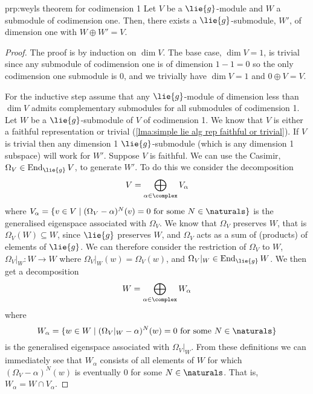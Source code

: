 \documentclass[fleqn]{NotesClass}
\DeclareMathOperator{\End}{End}
\begin{document}
    \begin{prp}{}{prp:weyls theorem for codimension 1}
        Let \(V\) be a \(\lie{g}\)-module and \(W\) a submodule of codimension one.
        Then, there exists a \(\lie{g}\)-submodule, \(W'\), of dimension one with \(W \oplus W' = V\).
        \begin{proof}
            The proof is by induction on \(\dim V\).
            The base case, \(\dim V = 1\), is trivial since any submodule of codimension one is of dimension \(1 - 1 = 0\) so the only codimension one submodule is \(0\), and we trivially have \(\dim V = 1\) and \(0 \oplus V = V\).
            
            For the inductive step assume that any \(\lie{g}\)-module of dimension less than \(\dim V \) admits complementary submodules for all submodules of codimension 1.
            Let \(W\) be a \(\lie{g}\)-submodule of \(V\) of codimension 1.
            We know that \(V\) is either a faithful representation or trivial (\cref{lma:simple lie alg rep faithful or trivial}).
            If \(V\) is trivial then any dimension 1 \(\lie{g}\)-submodule (which is any dimension 1 subspace) will work for \(W'\).
            Suppose \(V\) is faithful.
            We can use the Casimir, \(\Omega_V \in \End_{\lie{g}} V\), to generate \(W'\).
            To do this we consider the decomposition
            \begin{equation}
                V = \bigoplus_{\alpha \in \complex} V_\alpha
            \end{equation}
            where \(V_\alpha = \{v \in V \mid (\Omega_V - \alpha)^N(v) = 0 \text{ for some } N \in \naturals\}\) is the generalised eigenspace associated with \(\Omega_V\).
            We know that \(\Omega_V\) preserves \(W\), that is \(\Omega_V(W) \subseteq W\), since \(\lie{g}\) preserves \(W\), and \(\Omega_V\) acts as a sum of (products) of elements of \(\lie{g}\).
            We can therefore consider the restriction of \(\Omega_V\) to \(W\), \(\Omega_V|_W \colon W \to W\) where \(\Omega_V|_W(w) = \Omega_V(w)\), and \(\Omega_V|_W \in \End_{\lie{g}}W\).
            We then get a decomposition
            \begin{equation}
                W = \bigoplus_{\alpha \in \complex} W_\alpha
            \end{equation}
            where
            \begin{equation}
                W_\alpha = \{w \in W \mid (\Omega_V|_W - \alpha)^N(w) = 0 \text{ for some } N \in \naturals\}
            \end{equation}
            is the generalised eigenspace associated with \(\Omega_V|_W\).
            From these definitions we can immediately see that \(W_\alpha\) consists of all elements of \(W\) for which \((\Omega_V - \alpha)^N(w)\) is eventually \(0\) for some \(N \in \naturals\).
            That is, \(W_\alpha = W \cap V_\alpha\).
            

\end{proof}
\end{prp}
\end{document}
